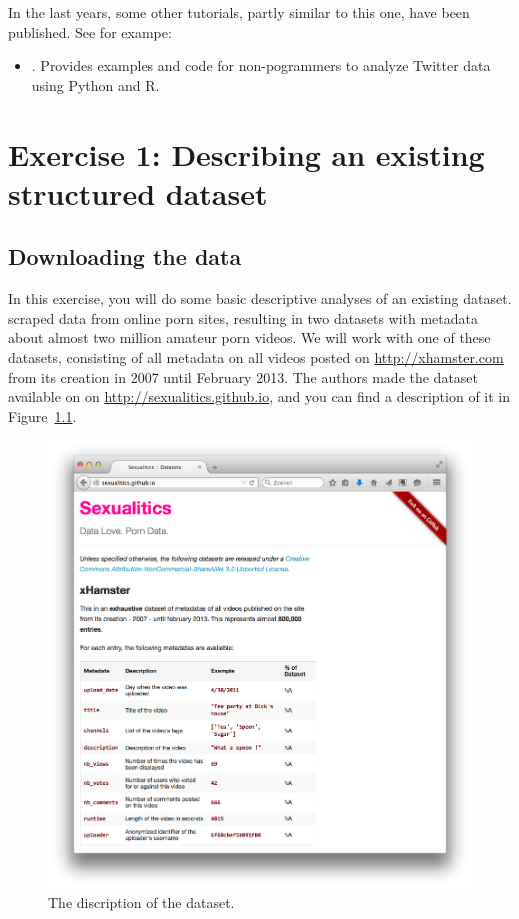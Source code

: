 \documentclass[a4paper,12pt]{book}
\begin{document}
In the last years, some other tutorials, partly similar to this one, have been published. See for exampe:
\begin{itemize}
\item \citealp{Jurgens2016}. Provides examples and code for non-pogrammers to analyze Twitter data using Python and R.
\end{itemize}


\appendix

\chapter[Exercise 1]{Exercise 1: Describing an existing structured dataset}
\section{Downloading the data}
In this exercise, you will do some basic descriptive analyses of an existing dataset. \cite{mazieres2014} scraped data from online porn sites, resulting in two datasets with  metadata about almost two million amateur porn videos. We will work with one of these datasets, consisting of all metadata on all videos posted on \url{http://xhamster.com} from its creation in 2007 until February 2013. The authors made the dataset available on on \url{http://sexualitics.github.io}, and you can find a description of it in Figure~\ref{fig:sexualitics}.

\begin{figure}[h]
\centering
\includegraphics[width=.75\paperwidth,keepaspectratio]{../pictures/sexualitics.png}
\caption{\label{fig:sexualitics}The discription of the dataset.}
\end{figure}
\end{document}
